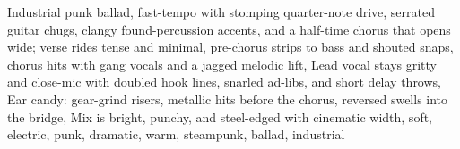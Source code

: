 
\begin{notes}
\end{notes}
\begin{style}
Industrial punk ballad, fast-tempo with stomping quarter-note drive, serrated guitar chugs, clangy found-percussion accents, and a half-time chorus that opens wide; verse rides tense and minimal, pre-chorus strips to bass and shouted snaps, chorus hits with gang vocals and a jagged melodic lift, Lead vocal stays gritty and close-mic with doubled hook lines, snarled ad-libs, and short delay throws, Ear candy: gear-grind risers, metallic hits before the chorus, reversed swells into the bridge, Mix is bright, punchy, and steel-edged with cinematic width, soft, electric, punk, dramatic, warm, steampunk, ballad, industrial
\end{style}
